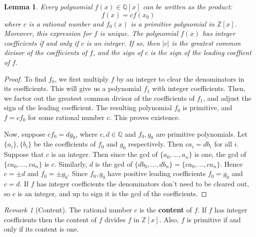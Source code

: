 \documentclass[12pt]{article}
\newtheorem{lem}[thm]{Lemma}  %
\theoremstyle{definition}
\theoremstyle{remark}
\newtheorem{rmk}[thm]{Remark}
\numberwithin{equation}{section}
\newcommand\Z{\mathbb Z}    %
\newcommand\Q{\mathbb Q}    %
\newcommand\B[1]{\textbf{ #1}}
\begin{document}
\begin{lem}
        Every polynomial $f(x) \in \Q[x]$ can be written as the product: \begin{equation}
                f(x) = cf(x_0)
        \end{equation}
        where $c$ is a rational number and $f_0(x)$ is a primitive polynomial in $\Z[x]$. Moreover, this expression for $f$ is unique. The polynomial $f(x)$ has integer coefficients if and only if $c$ is an integer. If so, then $|c|$ is the greatest common divisor of the coefficients of $f$, and the sign of $c$ is the sign of the leading coeffient of $f$.
\end{lem}
\begin{proof}
        To find $f_0$, we first multiply $f$ by an integer to clear the denominators in its coefficients. This will give us a polynomial $f_1$ with integer coefficients. Then, we factor out the greatest common divisor of the coefficients of $f_1$, and adjust the sign of the leading coefficient. The resulting polynomial $f_0$ is primitive, and $f=cf_0$ for some rational number $c$. This proves existence.


        Now, suppose $cf_0 = dg_0$, where $c,d \in \Q$ and $f_0,g_0$ are primitive polynomials. Let $\{a_i\},\{b_i\}$ be the coefficients of $f_0$ and $g_0$ respectively. Then $ca_i = db_i$ for all $i$. Suppose that $c$ is an integer. Then since the gcd of $\{a_0,...,a_n\}$ is one, the gcd of $\{ca_0,...,ca_n\}$ is $c$. Similarly, $d$ is the gcd of $\{db_0,...,db_n\} = \{ca_0,...,ca_n\}$. Hence $c = \pm d$ and $f_0 = \pm g_0$. Since $f_0,g_0$ have positive leading coefficients $f_0 = g_0$ and $c = d$. If $f$ has integer coefficients the denominators don't need to be cleared out, so $c$ is an integer, and up to sign it is the gcd of the coefficients.
\end{proof}



\vspace{15pt}

\begin{rmk}[Content]
        The rational number $c$ is the \B{content} of $f$. If $f$ has integer coefficients then the content of $f$ divides $f$ in $\Z[x]$. Also, $f$ is primitive if and only if its content is one.
\end{rmk}

\vspace{15pt}
\end{document}
